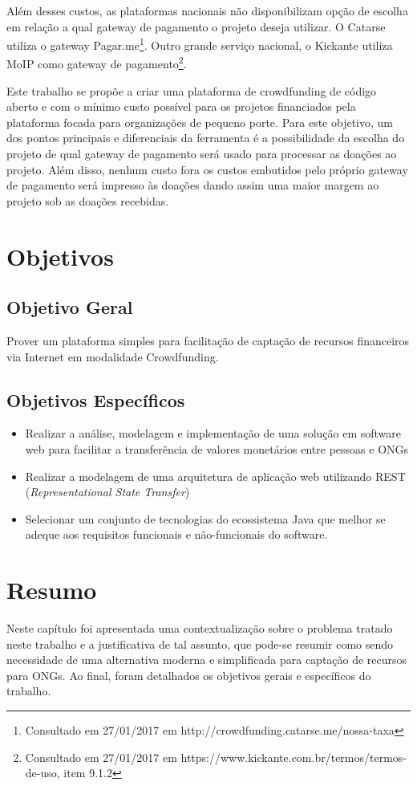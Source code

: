 Além desses custos, as plataformas nacionais não disponibilizam opção de escolha em relação a qual gateway de pagamento o projeto deseja utilizar. O Catarse utiliza o gateway Pagar.me\footnote{Consultado em 27/01/2017 em http://crowdfunding.catarse.me/nossa-taxa}. Outro grande serviço nacional, o Kickante utiliza MoIP como gateway de pagamento\footnote{Consultado em 27/01/2017 em https://www.kickante.com.br/termos/termos-de-uso, item 9.1.2}.

Este trabalho se propõe a criar uma plataforma de crowdfunding de código aberto e com o mínimo custo possível para os projetos financiados pela plataforma focada para organizações de pequeno porte. Para este objetivo, um dos pontos principais e diferenciais da ferramenta é a possibilidade da escolha do projeto de qual gateway de pagamento será usado para processar as doações ao projeto. Além disso, nenhum custo fora os custos embutidos pelo próprio gateway de pagamento será impresso às doações dando assim uma maior margem ao projeto sob as doações recebidas.



\section{Objetivos}
\subsection{Objetivo Geral}
Prover um plataforma simples para facilitação de captação de recursos financeiros via Internet em modalidade Crowdfunding.

\subsection{Objetivos Específicos}
\begin{itemize}
  \item Realizar a análise, modelagem e implementação de uma solução em software web para facilitar a transferência de valores monetários entre pessoas e ONGs
  \item Realizar a modelagem de uma arquitetura de aplicação web utilizando REST (\emph{Representational State Transfer})
  \item Selecionar um conjunto de tecnologias do ecossistema Java que melhor se adeque aos requisitos funcionais e não-funcionais do software.
\end{itemize}



\section*{Resumo}
Neste capítulo foi apresentada uma contextualização sobre o problema tratado neste trabalho e a justificativa de tal assunto, que pode-se resumir como sendo necessidade de uma alternativa moderna e simplificada para captação de recursos para ONGs. Ao final, foram detalhados os objetivos gerais e específicos do trabalho.

